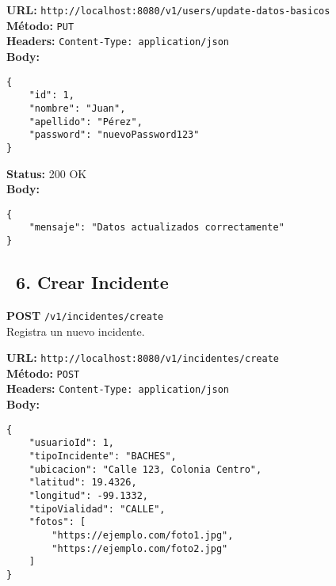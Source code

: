 \begin{tcolorbox}[request]
    \textbf{URL:} \textcolor{urlColor}{\texttt{http://localhost:8080/v1/users/update-datos-basicos}}\\
    \textbf{Método:} \textcolor{methodColor}{\texttt{PUT}}\\
    \textbf{Headers:} \textcolor{headerColor}{\texttt{Content-Type: application/json}}\\
    \textbf{Body:}
    \begin{verbatim}
{
    "id": 1,
    "nombre": "Juan",
    "apellido": "Pérez",
    "password": "nuevoPassword123"
}
    \end{verbatim}
\end{tcolorbox}

\begin{tcolorbox}[response]
    \textbf{Status:} 200 OK\\
    \textbf{Body:}
    \begin{verbatim}
{
    "mensaje": "Datos actualizados correctamente"
}
    \end{verbatim}
\end{tcolorbox}

\subsection*{\faServer\ 6. Crear Incidente}
\begin{tcolorbox}[endpoint]
    \textbf{POST} \texttt{/v1/incidentes/create}\\
    Registra un nuevo incidente.
\end{tcolorbox}

\begin{tcolorbox}[request]
    \textbf{URL:} \textcolor{urlColor}{\texttt{http://localhost:8080/v1/incidentes/create}}\\
    \textbf{Método:} \textcolor{methodColor}{\texttt{POST}}\\
    \textbf{Headers:} \textcolor{headerColor}{\texttt{Content-Type: application/json}}\\
    \textbf{Body:}
    \begin{verbatim}
{
    "usuarioId": 1,
    "tipoIncidente": "BACHES",
    "ubicacion": "Calle 123, Colonia Centro",
    "latitud": 19.4326,
    "longitud": -99.1332,
    "tipoVialidad": "CALLE",
    "fotos": [
        "https://ejemplo.com/foto1.jpg",
        "https://ejemplo.com/foto2.jpg"
    ]
}
    \end{verbatim}
\end{tcolorbox}

